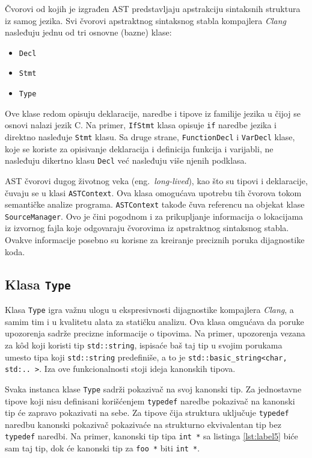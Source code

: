 \documentclass[12pt,oneside]{memoir}
\begin{document}
\v{C}vorovi od kojih je izgrađen AST predstavljaju apstrakciju sintaksnih struktura iz samog jezika.
Svi \v{c}vorovi apstraktnog sintaksnog stabla kompajlera \textit{Clang} nasleđuju jednu od tri osnovne (bazne) klase:
\begin{itemize}
  \item \texttt{Decl}
  \item \texttt{Stmt}
  \item \texttt{Type}
\end{itemize}
Ove klase redom opisuju deklaracije, naredbe i tipove iz familije jezika u \v{c}ijoj se osnovi nalazi jezik C.
Na primer, \texttt{IfStmt} klasa opisuje \texttt{if} naredbe jezika i direktno nasleđuje \texttt{Stmt} klasu. Sa druge strane, \texttt{FunctionDecl} i \texttt{VarDecl} klase, koje se koriste za opisivanje deklaracija i definicija funkcija i varijabli, ne nasleđuju dikertno klasu \texttt{Decl} ve\'{c} nasleđuju vi\v{s}e njenih podklasa.
\par
AST \v{c}vorovi dugog \v{z}ivotnog veka (eng.~\textit{long-lived}), kao \v{s}to su tipovi i deklaracije, \v{c}uvaju se u klasi \texttt{ASTContext}. Ova klasa
omogu\'{c}ava upotrebu tih \v{c}vorova tokom semanti\v{c}ke analize programa. \texttt{ASTContext} takođe \v{c}uva referencu na objekat klase \texttt{SourceManager}. Ovo je
\v{c}ini pogodnom i za prikupljanje informacija o lokacijama iz izvornog fajla koje odgovaraju \v{c}vorovima iz apstraktnog sintaksnog stabla. Ovakve informacije posebno su korisne za kreiranje
preciznih poruka dijagnostike koda.

\subsection{Klasa \texttt{Type}}
  Klasa \texttt{Type} igra va\v{z}nu ulogu u ekspresivnosti dijagnostike kompajlera \textit{Clang}, a samim tim i u kvalitetu alata za stati\v{c}ku analizu. Ova klasa omgu\'{c}ava da poruke upozorenja sadr\v{z}e precizne informacije o tipovima. Na primer, upozorenja vezana za k\^{o}d koji koristi tip \texttt{std::string}, ispisa\'{c}e ba\v{s} taj tip u svojim porukama umesto tipa koji \texttt{std::string} predefini\v{s}e, a to je \texttt{std::basic\_string<char, std:.. >}. Iza ove funkcionalnosti stoji ideja kanonskih tipova.
  
  \par
  Svaka instanca klase \texttt{Type} sadr\v{z}i pokaziva\v{c} na svoj kanonski tip. Za jednostavne tipove koji nisu definisani kori\v{s}\'{c}enjem \texttt{typedef} naredbe pokaziva\v{c} na kanonski tip \'{c}e zapravo pokazivati na sebe. Za tipove \v{c}ija struktura uklju\v{c}uje \texttt{typedef} naredbu kanonski pokaziva\v{c} pokaziva\'{c}e na strukturno ekvivalentan tip bez \texttt{typedef} naredbi.
  Na primer, kanonski tip tipa \texttt{int *} sa listinga \ref{lst:label5}  bi\'{c}e sam taj tip, dok \'{c}e kanonski tip za \texttt{foo *} biti \texttt{int *}.
\end{document}
